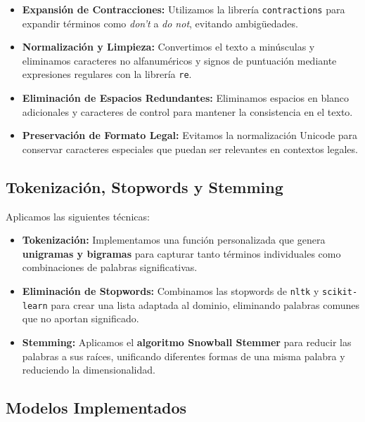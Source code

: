 \documentclass[11pt,english]{article}
\theoremstyle{plain}
\begin{document}
\begin{itemize}
    \item \textbf{Expansión de Contracciones:} Utilizamos la librería \texttt{contractions} para expandir términos como \textit{don't} a \textit{do not}, evitando ambigüedades.

    \item \textbf{Normalización y Limpieza:} Convertimos el texto a minúsculas y eliminamos caracteres no alfanuméricos y signos de puntuación mediante expresiones regulares con la librería \texttt{re}.

    \item \textbf{Eliminación de Espacios Redundantes:} Eliminamos espacios en blanco adicionales y caracteres de control para mantener la consistencia en el texto.

    \item \textbf{Preservación de Formato Legal:} Evitamos la normalización Unicode para conservar caracteres especiales que puedan ser relevantes en contextos legales.
\end{itemize}

\subsection{Tokenización, Stopwords y Stemming}

Aplicamos las siguientes técnicas:

\begin{itemize}
    \item \textbf{Tokenización:} Implementamos una función personalizada que genera \textbf{unigramas y bigramas} para capturar tanto términos individuales como combinaciones de palabras significativas.

    \item \textbf{Eliminación de Stopwords:} Combinamos las stopwords de \texttt{nltk} y \texttt{scikit-learn} para crear una lista adaptada al dominio, eliminando palabras comunes que no aportan significado.

    \item \textbf{Stemming:} Aplicamos el \textbf{algoritmo Snowball Stemmer} para reducir las palabras a sus raíces, unificando diferentes formas de una misma palabra y reduciendo la dimensionalidad.
\end{itemize}

\subsection{Modelos Implementados}
\end{document}
